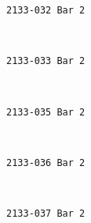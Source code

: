 \documentclass[11pt]{article}
\begin{document}
    \begin{Verbatim}[commandchars=\\\{\}]
2133-032 Bar 2

    \end{Verbatim}

    \begin{center}
    \end{center}
    { \hspace*{\fill} \\}
    
    \begin{Verbatim}[commandchars=\\\{\}]
2133-033 Bar 2

    \end{Verbatim}

    \begin{center}
    \end{center}
    { \hspace*{\fill} \\}
    
    \begin{Verbatim}[commandchars=\\\{\}]
2133-035 Bar 2

    \end{Verbatim}

    \begin{center}
    \end{center}
    { \hspace*{\fill} \\}
    
    \begin{Verbatim}[commandchars=\\\{\}]
2133-036 Bar 2

    \end{Verbatim}

    \begin{center}
    \end{center}
    { \hspace*{\fill} \\}
    
    \begin{Verbatim}[commandchars=\\\{\}]
2133-037 Bar 2

    \end{Verbatim}
\end{document}
